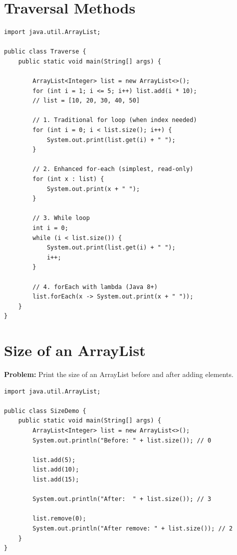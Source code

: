 \documentclass[12pt,a4paper,oneside]{book}
\begin{document}
\section{Traversal Methods}

\begin{lstlisting}[caption={ArrayList --- Four Ways to Traverse}]
import java.util.ArrayList;

public class Traverse {
    public static void main(String[] args) {

        ArrayList<Integer> list = new ArrayList<>();
        for (int i = 1; i <= 5; i++) list.add(i * 10);
        // list = [10, 20, 30, 40, 50]

        // 1. Traditional for loop (when index needed)
        for (int i = 0; i < list.size(); i++) {
            System.out.print(list.get(i) + " ");
        }

        // 2. Enhanced for-each (simplest, read-only)
        for (int x : list) {
            System.out.print(x + " ");
        }

        // 3. While loop
        int i = 0;
        while (i < list.size()) {
            System.out.print(list.get(i) + " ");
            i++;
        }

        // 4. forEach with lambda (Java 8+)
        list.forEach(x -> System.out.print(x + " "));
    }
}
\end{lstlisting}

\section{Size of an ArrayList}

\textbf{Problem:} Print the size of an ArrayList before and after adding elements.

\begin{lstlisting}[caption={ArrayList --- size() demo}]
import java.util.ArrayList;

public class SizeDemo {
    public static void main(String[] args) {
        ArrayList<Integer> list = new ArrayList<>();
        System.out.println("Before: " + list.size()); // 0

        list.add(5);
        list.add(10);
        list.add(15);

        System.out.println("After:  " + list.size()); // 3

        list.remove(0);
        System.out.println("After remove: " + list.size()); // 2
    }
}
\end{lstlisting}
\end{document}
